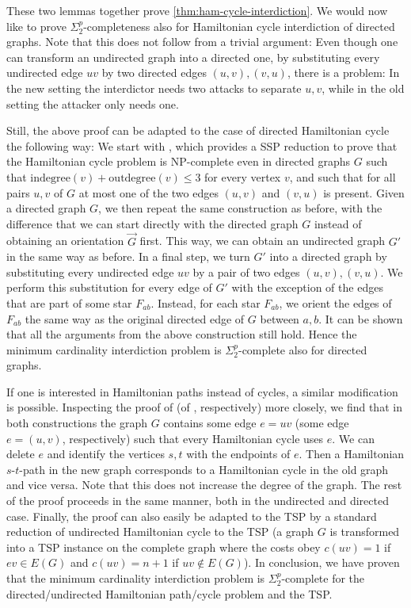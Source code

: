 These two lemmas together prove \cref{thm:ham-cycle-interdiction}.
We would now like to prove $\Sigma^p_2$-completeness also for Hamiltonian cycle interdiction of directed graphs.
Note that this does not follow from a trivial argument: 
Even though one can transform an undirected graph into a directed one, by substituting every undirected edge $uv$ by two directed edges $(u,v), (v,u)$, there is a problem: In the new setting the interdictor needs two attacks to separate $u,v$, while in the old setting the attacker only needs one. 

Still, the above proof can be adapted to the case of directed Hamiltonian cycle the following way: 
We start with \cite{plesn1979np}, which provides a SSP reduction to prove that the Hamiltonian cycle problem is NP-complete even in directed graphs $G$ such that $\text{indegree}(v) + \text{outdegree}(v) \leq 3$ for every vertex $v$, and such that for all pairs $u,v$ of $G$ at most one of the two edges $(u,v)$ and $(v,u)$ is present. 
Given a directed graph $G$, we then repeat the same construction as before, 
with the difference that we can start directly with the directed graph $G$ instead of obtaining an orientation $\overrightarrow{G}$ first.
This way, we can obtain an undirected graph $G'$ in the same way as before. 
In a final step, we turn $G'$ into a directed graph by substituting every undirected edge $uv$ by a pair of two edges $(u,v), (v,u)$. We perform this substitution for every edge of $G'$ with the exception of the edges that are part of some star $F_{ab}$.
Instead, for each star $F_{ab}$, we orient the edges of $F_{ab}$ the same way as the original directed edge of $G$ between $a,b$.
It can be shown that all the arguments from the above construction still hold. 
Hence the minimum cardinality interdiction problem is $\Sigma^p_2$-complete also for directed graphs.


If one is interested in Hamiltonian paths instead of cycles, a similar modification is possible.
Inspecting the proof of \cite{DBLP:journals/siamcomp/GareyJT76} (of \cite{plesn1979np}, respectively) more closely, we find that in both constructions the graph $G$ contains some edge $e = uv$ (some edge $e = (u,v)$, respectively) such that every Hamiltonian cycle uses $e$. 
We can delete $e$ and identify the vertices $s,t$ with the endpoints of $e$.
Then a Hamiltonian $s$-$t$-path in the new graph corresponds to a Hamiltonian cycle in the old graph and vice versa.
Note that this does not increase the degree of the graph.
The rest of the proof proceeds in the same manner, both in the undirected and directed case.
Finally, the proof can also easily be adapted to the TSP by a standard reduction of undirected Hamiltonian cycle to the TSP 
(a graph $G$ is transformed into a TSP instance on the complete graph where the costs obey $c(uv) = 1$ if $ev \in E(G)$ and $c(uv) = n+1$ if $uv \not\in E(G)$).
In conclusion, we have proven that the minimum cardinality interdiction problem is $\Sigma^p_2$-complete for the directed/undirected Hamiltonian path/cycle problem and the TSP. 
